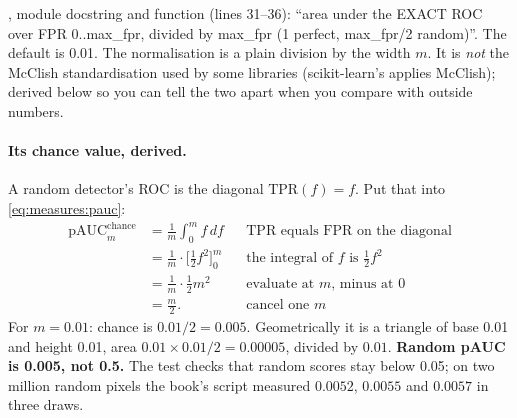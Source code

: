 \begin{sourcenote}
, module docstring and function  (lines 31--36): ``area under the EXACT
ROC over FPR 0..max\_fpr, divided by max\_fpr (1 perfect, max\_fpr/2 random)''. The default  is
0.01. The normalisation is a plain division by the width $m$. It is \emph{not} the McClish standardisation used by
some libraries (scikit-learn's  applies McClish); derived below so you can tell the
two apart when you compare with outside numbers.
\end{sourcenote}

\paragraph{Its chance value, derived.} A random detector's ROC is the diagonal $\mathrm{TPR}(f) = f$. Put that
into \cref{eq:measures:pauc}:
\begin{align*}
\mathrm{pAUC}_m^{\text{chance}} &= \frac1m \int_0^m f\,df && \text{TPR equals FPR on the diagonal}\\
&= \frac1m \cdot \Big[\tfrac12 f^2\Big]_0^m && \text{the integral of $f$ is $\tfrac12 f^2$}\\
&= \frac1m \cdot \tfrac12 m^2 && \text{evaluate at $m$, minus at $0$}\\
&= \frac{m}{2}. && \text{cancel one $m$}
\end{align*}
For $m = 0.01$: chance is $0.01/2 = 0.005$. Geometrically it is a triangle of base 0.01 and height 0.01, area
$0.01 \times 0.01 / 2 = 0.00005$, divided by $0.01$. \textbf{Random pAUC is 0.005, not 0.5.} The test
 checks that random scores stay below 0.05; on two million random pixels the
book's script measured $0.0052$, $0.0055$ and $0.0057$ in three draws\tagC{}.

